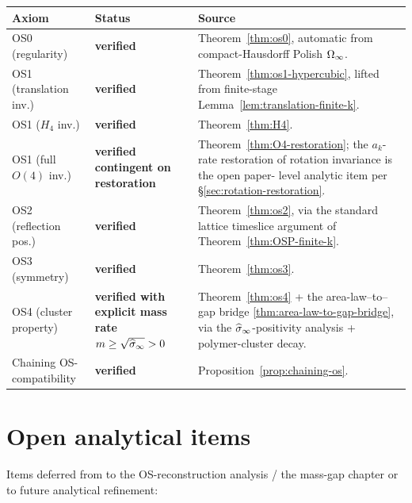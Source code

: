 \begin{center}
\begin{tabular}{|l|l|p{6cm}|}
\hline
\textbf{Axiom} & \textbf{Status} & \textbf{Source} \\
\hline
OS0 (regularity) & \textbf{verified} & Theorem~\ref{thm:os0},
  automatic from compact-Hausdorff Polish $\Omega_\infty$. \\
\hline
OS1 (translation inv.) & \textbf{verified} & Theorem~\ref{thm:os1-hypercubic},
  lifted from finite-stage Lemma~\ref{lem:translation-finite-k}. \\
\hline
OS1 ($H_4$ inv.) & \textbf{verified} & Theorem~\ref{thm:H4}. \\
\hline
OS1 (full $O(4)$ inv.) & \textbf{verified contingent on
  restoration} & Theorem~\ref{thm:O4-restoration}; the
  $a_k$-rate restoration of rotation invariance is the open paper-
  level analytic item per \S\ref{sec:rotation-restoration}. \\
\hline
OS2 (reflection pos.) & \textbf{verified} & Theorem~\ref{thm:os2},
  via the standard lattice timeslice
  argument of Theorem~\ref{thm:OSP-finite-k}. \\
\hline
OS3 (symmetry) & \textbf{verified} & Theorem~\ref{thm:os3}. \\
\hline
OS4 (cluster property) & \textbf{verified with explicit mass rate
  $m \ge \sqrt{\widehat{\sigma}_\infty} > 0$} & Theorem~\ref{thm:os4} + the
  area-law--to--gap bridge \cref{thm:area-law-to-gap-bridge}, via the
  $\widehat{\sigma}_\infty$-positivity analysis + polymer-cluster decay. \\
\hline
Chaining OS-compatibility & \textbf{verified} & Proposition~\ref{prop:chaining-os}. \\
\hline
\end{tabular}
\end{center}

\section{Open analytical items}
\label{sec:open}

Items deferred from  to the OS-reconstruction analysis / the mass-gap chapter or to future
analytical refinement:


